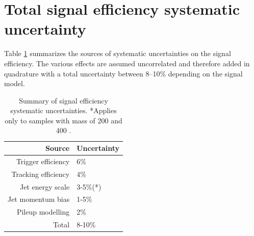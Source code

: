 \section{Total signal efficiency systematic uncertainty}

Table \ref{tab:signalsystematics} summarizes the sources of systematic uncertainties on the signal efficiency. 
The various effects are assumed uncorrelated and therefore added in quadrature with a total
uncertainty between 8--10\% depending on the signal model.

\begin{table}[htbp]
\centering
\caption{Summary of signal efficiency systematic uncertainties. *Applies only to samples with
 \Higgs mass of 200 and 400 \GeV.
\label{tab:signalsystematics}}
\vspace{0.1cm}
 \begin{tabular}{r|l}
  Source & Uncertainty \\
  \hline
  Trigger efficiency & 6\% \\
  Tracking efficiency & 4\% \\
  Jet energy scale & 3-5\%(*) \\
  Jet momentum bias & 1-5\% \\ 
  Pileup modelling & 2\% \\
  \hline
 Total & 8-10\% \\
 \end{tabular}
\end{table} 
